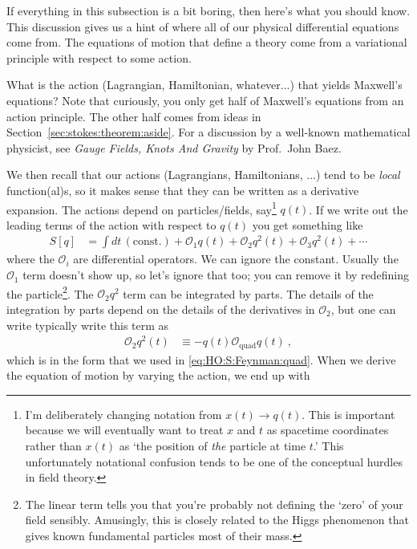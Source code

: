 If everything in this subsection is a bit boring, then here's what you should know. This discussion gives us a hint of where all of our physical differential equations come from. The equations of motion that define a theory come from a variational principle with respect to some action. 
\begin{exercise}
[optional] What is the action (Lagrangian, Hamiltonian, whatever...) that yields Maxwell's equations? Note that curiously, you only get half of Maxwell's equations from an action principle. The other half comes from ideas in Section~\ref{sec:stokes:theorem:aside}. For a discussion by a well-known  mathematical physicist, see \emph{Gauge Fields, Knots And Gravity} by Prof.~John Baez.
\end{exercise}
We then recall that our actions (Lagrangians, Hamiltonians, ...) tend to be \emph{local} function(al)s, so it makes sense that they can be written as a derivative expansion. The actions depend on particles/fields, say\footnote{I'm deliberately changing notation from $x(t)\to q(t)$. This is important because we will eventually want to treat $x$ and $t$ as spacetime coordinates rather than $x(t)$ as `the position of \emph{the} particle at time $t$.' This unfortunately notational confusion tends to be one of the conceptual hurdles in field theory.} $q(t)$. If we write out the leading terms of the action with respect to $q(t)$ you get something like
\begin{align}
  S[q] &= \int dt \, (\text{const.}) + \mathcal O_1 q(t) + \mathcal O_2 q^2(t) + \mathcal O_3 q^2(t) + \cdots
\end{align}
where the $\mathcal O_i$ are differential operators. We can ignore the constant. Usually the $\mathcal O_1$ term doesn't show up, so let's ignore that too; you can remove it by redefining the particle\footnote{The linear term tells you that you're probably not defining the `zero' of your field sensibly. Amusingly, this is closely related to the Higgs phenomenon that gives known fundamental particles most of their mass.}. The $\mathcal O_2 q^2$ term can be integrated by parts. The details of the integration by parts depend on the details of the derivatives in $\mathcal O_2$, but one can write typically write this term as
\begin{align}
  \mathcal O_2 q^2(t) &\equiv - q(t) \mathcal O_\text{quad} q(t) \ ,
\end{align}
which is in the form that we used in \eqref{eq:HO:S:Feynman:quad}. When we derive the equation of motion by varying the action, we end up with
